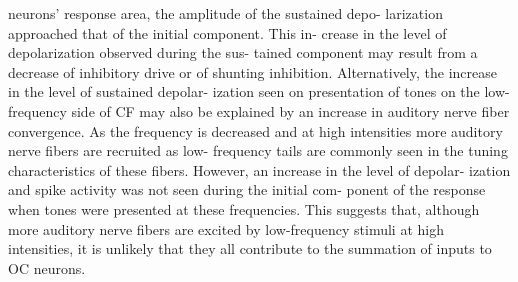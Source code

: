 neurons’ response area, the amplitude of the sustained depo-
larization approached that of the initial component. This in-
crease in the level of depolarization observed during the sus-
tained component may result from a decrease of inhibitory
drive or of shunting inhibition.
Alternatively, the increase in the level of sustained depolar-
ization seen on presentation of tones on the low-frequency side
of CF may also be explained by an increase in auditory nerve
fiber convergence. As the frequency is decreased and at high
intensities more auditory nerve fibers are recruited as low-
frequency tails are commonly seen in the tuning characteristics
of these fibers. However, an increase in the level of depolar-
ization and spike activity was not seen during the initial com-
ponent of the response when tones were presented at these
frequencies. This suggests that, although more auditory nerve
fibers are excited by low-frequency stimuli at high intensities,
it is unlikely that they all contribute to the summation of inputs
to OC neurons.




